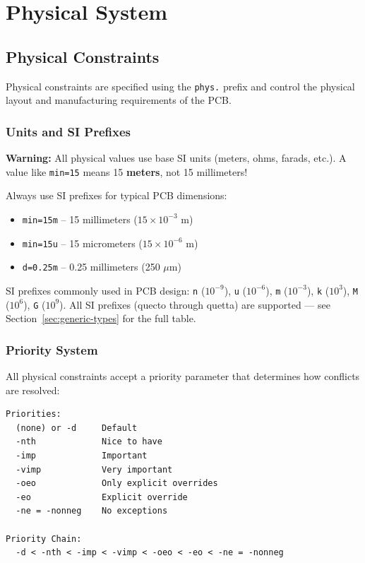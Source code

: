 \part{Physical System}
\chapter{Physical Constraints}
\label{sec:physical-constraints}
Physical constraints are specified using the \texttt{phys.} prefix and control the physical layout and manufacturing requirements of the PCB.

\section{Units and SI Prefixes}
\textbf{Warning:} All physical values use base SI units (meters, ohms, farads, etc.). A value like \texttt{min=15} means 15 \textbf{meters}, not 15 millimeters!

Always use SI prefixes for typical PCB dimensions:
\begin{itemize}
\item \texttt{min=15m} -- 15 millimeters ($15 \times 10^{-3}$ m)
\item \texttt{min=15u} -- 15 micrometers ($15 \times 10^{-6}$ m)
\item \texttt{d=0.25m} -- 0.25 millimeters (250 $\mu$m)
\end{itemize}

SI prefixes commonly used in PCB design: \texttt{n} ($10^{-9}$), \texttt{u} ($10^{-6}$), \texttt{m} ($10^{-3}$), \texttt{k} ($10^{3}$), \texttt{M} ($10^{6}$), \texttt{G} ($10^{9}$). All SI prefixes (quecto through quetta) are supported — see Section~\ref{sec:generic-types} for the full table.

\section{Priority System}
All physical constraints accept a priority parameter that determines how conflicts are resolved:
\begin{verbatim}
Priorities:
  (none) or -d     Default
  -nth             Nice to have
  -imp             Important
  -vimp            Very important
  -oeo             Only explicit overrides
  -eo              Explicit override
  -ne = -nonneg    No exceptions

Priority Chain: 
  -d < -nth < -imp < -vimp < -oeo < -eo < -ne = -nonneg
\end{verbatim}

